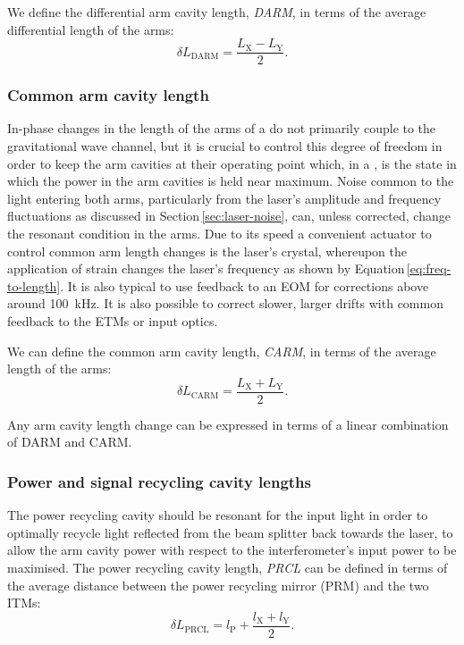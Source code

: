 We define the differential arm cavity length, \emph{\gls{DARM}}, in terms of the average differential length of the arms:
\begin{equation}
  \label{eq:darm-length}
  \delta L_{\text{DARM}} = \frac{L_{\text{X}} - L_{\text{Y}}}{2}.
\end{equation}

\subsubsection{Common arm cavity length}
In-phase changes in the length of the arms of a \MI{} do not primarily couple to the gravitational wave channel, but it is crucial to control this degree of freedom in order to keep the arm cavities at their operating point which, in a \DRFPMI{}, is the state in which the power in the arm cavities is held near maximum. Noise common to the light entering both arms, particularly from the laser's amplitude and frequency fluctuations as discussed in Section\,\ref{sec:laser-noise}, can, unless corrected, change the resonant condition in the arms. Due to its speed a convenient actuator to control common arm length changes is the laser's crystal, whereupon the application of strain changes the laser's frequency as shown by Equation\,\ref{eq:freq-to-length}. It is also typical to use feedback to an \gls{EOM} for corrections above around \SI{100}{\kilo\hertz}. It is also possible to correct slower, larger drifts with common feedback to the \glspl{ETM} or input optics.

We can define the common arm cavity length, \emph{\gls{CARM}}, in terms of the average length of the arms:
\begin{equation}
  \delta L_{\text{CARM}} = \frac{L_{\text{X}} + L_{\text{Y}}}{2}.
\end{equation}

Any arm cavity length change can be expressed in terms of a linear combination of \gls{DARM} and \gls{CARM}.

\subsubsection{Power and signal recycling cavity lengths}
The power recycling cavity should be resonant for the input light in order to optimally recycle light reflected from the beam splitter back towards the laser, to allow the arm cavity power with respect to the interferometer's input power to be maximised. The power recycling cavity length, \emph{\gls{PRCL}} can be defined in terms of the average distance between the power recycling mirror (\gls{PRM}) and the two \glspl{ITM}:
\begin{equation}
  \label{eq:prcl-length}
  \delta L_{\text{PRCL}} = l_{\text{P}} + \frac{l_{\text{X}} + l_{\text{Y}}}{2}.
\end{equation}

